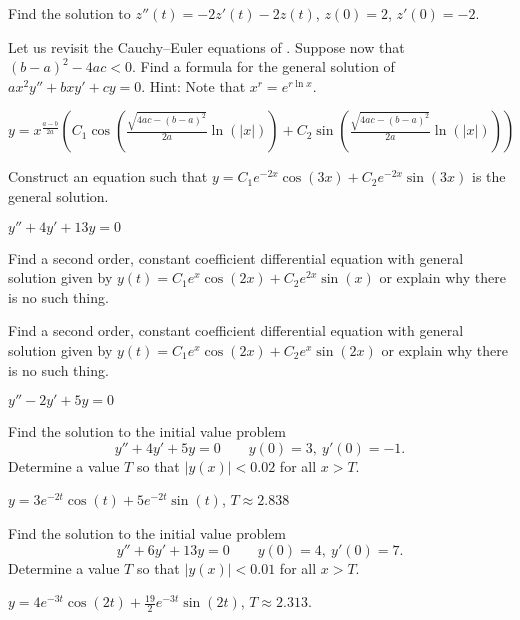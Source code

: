 \begin{exercise}\ansMark%
Find the solution to
$z''(t) = -2z'(t)-2z(t)$, $z(0) = 2$, $z'(0)= -2$.
\end{exercise}


\begin{exercise}
Let us revisit the Cauchy--Euler equations of
.  Suppose now
that ${(b-a)}^2-4ac < 0$.  Find a formula for the general solution
of $a x^2 y'' + b x y' + c y = 0$.  Hint: Note that $x^r = e^{r \ln x}$.
\end{exercise}
\comboSol{%
}
{%
$y = x^{\frac{a-b}{2a}}\left( C_1\cos\left( \frac{\sqrt{4ac-(b-a)^2}}{2a} \ln(|x|) \right) + C_2\sin\left( \frac{\sqrt{4ac-(b-a)^2}}{2a} \ln(|x|) \right) \right)$
}

\begin{exercise}
Construct an equation such that $y = C_1 e^{-2x} \cos(3x) + C_2 e^{-2x}
\sin(3x)$ is the general
solution.
\end{exercise}
\comboSol{%
}
{%
$y'' + 4y' + 13y = 0$
}

\begin{exercise}\ansMark%
Find a second order, constant coefficient differential equation with general solution given by $y(t) = C_1e^{x} \cos(2x) + C_2e^{2x}\sin(x)$ or explain why there is no such thing.
\end{exercise}
%

\begin{exercise}
Find a second order, constant coefficient differential equation with general solution given by $y(t) = C_1e^{x} \cos(2x) + C_2e^{x}\sin(2x)$ or explain why there is no such thing.
\end{exercise}
\comboSol{%
}
{%
$y'' -2y' + 5y = 0$
}

\begin{exercise}
Find the solution to the initial value problem 
\[ y'' + 4y' + 5y = 0 \qquad y(0) = 3,\ y'(0) = -1.\]
Determine a value $T$ so that $|y(x)| < 0.02$ for all $x > T$. 
\end{exercise}
\comboSol{%
}
{%
$y = 3e^{-2t}\cos(t) + 5e^{-2t}\sin(t)$, $T \approx 2.838$
}

\begin{exercise}
Find the solution to the initial value problem 
\[ y'' + 6y' + 13y = 0 \qquad y(0) = 4,\ y'(0) = 7.\]
Determine a value $T$ so that $|y(x)| < 0.01$ for all $x > T$. 
\end{exercise}
\comboSol{%
}
{%
$y = 4e^{-3t}\cos(2t) + \frac{19}{2}e^{-3t}\sin(2t)$, $T \approx 2.313$.
}

\setcounter{exercise}{100}






